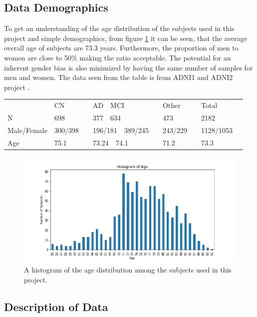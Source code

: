 \documentclass[12pt, fleqn, titlepage]{article}
\begin{document}
\subsection{Data Demographics}
To get an understanding of the age distribution of the subjects used in this project and simple demographics, from figure \ref{fig:age} it can be seen, that the average overall age of subjects are 73.3 years. Furthermore, the proportion of men to women are close to 50\% making the ratio acceptable. The  potential for an inherent gender bias is also minimized by having the same number of samples for men and women. The data seen from the table is from ADNI1 and ADNI2 project \cite{adni} \cite{adni1} .

\begin{table}[H]
	\begin{tabular}{llllll}
		& CN&\ \ AD\ \ MCI &\ \ Other &\ \ Total   \\
		N & 698&\ \ 377\ \ 634 &\ \ 473 &\ \ 2182   \\
		Male/Female & 300/398&\ \ 196/181\ \ 389/245 &\ \ 243/229  &\ \ 1128/1053   \\
		Age & 75.1&\ \ 73.24\ \ 74.1 &\ \ 71.2 &\ \ 73.3   \\
	\end{tabular}
\end{table}


\begin{figure}[H]
	\centering
	\includegraphics[width=0.9\linewidth]{imgs/age_distro}
	\caption{A histogram of the age distribution among the subjects used in this project.} 
	\label{fig:age}
\end{figure}


\subsection{Description of Data} \label{dataDescription}
\end{document}
